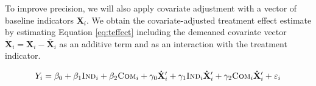 \documentclass[11pt, a4paper]{article}\usepackage[]{graphicx}\usepackage[]{color}
\begin{document}
        \begin{table}[t]
        \centering
        \caption{Primary hypothesis tests}
        \label{tab:hypotheses}
        \end{table}

        \begin{table}[t]
        \centering
        \caption{Intermediate outcomes for mechanism analysis}
        \label{tab:mechvars}
        \end{table}

        To improve precision, we will also apply covariate adjustment with a vector of baseline indicators $\mathbf{X}_i$. We obtain the covariate-adjusted treatment effect estimate by estimating Equation \ref{eq:teffect} including the demeaned covariate vector $\mathbf{\dot X}_{i} = \mathbf{X}_{i} - \mathbf{\bar X}_{i}$ as an additive term and as an interaction with the treatment indicator. %

        \begin{equation} \label{eq:controls}
            Y_{i} = \beta_{0} + \beta_{1}\text{\textsc{Ind}}_{i} + \beta_{2}\text{\textsc{Com}}_{i} + \gamma_{0} \mathbf{\dot X}'_i + \gamma_{1}\text{\textsc{Ind}}_{i} \mathbf{\dot X}'_i + \gamma_{2}\text{\textsc{Com}}_{i} \mathbf{\dot X}'_i + \varepsilon_{i}
        \end{equation}
\end{document}
